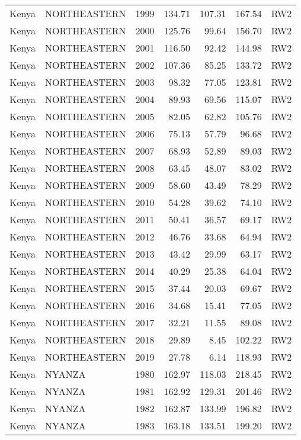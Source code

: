 \begin{longtable}{lllrrrl}
  Kenya & NORTHEASTERN & 1999 & 134.71 & 107.31 & 167.54 & RW2 \\ 
  Kenya & NORTHEASTERN & 2000 & 125.76 & 99.64 & 156.70 & RW2 \\ 
  Kenya & NORTHEASTERN & 2001 & 116.50 & 92.42 & 144.98 & RW2 \\ 
  Kenya & NORTHEASTERN & 2002 & 107.36 & 85.25 & 133.72 & RW2 \\ 
  Kenya & NORTHEASTERN & 2003 & 98.32 & 77.05 & 123.81 & RW2 \\ 
  Kenya & NORTHEASTERN & 2004 & 89.93 & 69.56 & 115.07 & RW2 \\ 
  Kenya & NORTHEASTERN & 2005 & 82.05 & 62.82 & 105.76 & RW2 \\ 
  Kenya & NORTHEASTERN & 2006 & 75.13 & 57.79 & 96.68 & RW2 \\ 
  Kenya & NORTHEASTERN & 2007 & 68.93 & 52.89 & 89.03 & RW2 \\ 
  Kenya & NORTHEASTERN & 2008 & 63.45 & 48.07 & 83.02 & RW2 \\ 
  Kenya & NORTHEASTERN & 2009 & 58.60 & 43.49 & 78.29 & RW2 \\ 
  Kenya & NORTHEASTERN & 2010 & 54.28 & 39.62 & 74.10 & RW2 \\ 
  Kenya & NORTHEASTERN & 2011 & 50.41 & 36.57 & 69.17 & RW2 \\ 
  Kenya & NORTHEASTERN & 2012 & 46.76 & 33.68 & 64.94 & RW2 \\ 
  Kenya & NORTHEASTERN & 2013 & 43.42 & 29.99 & 63.17 & RW2 \\ 
  Kenya & NORTHEASTERN & 2014 & 40.29 & 25.38 & 64.04 & RW2 \\ 
  Kenya & NORTHEASTERN & 2015 & 37.44 & 20.03 & 69.67 & RW2 \\ 
  Kenya & NORTHEASTERN & 2016 & 34.68 & 15.41 & 77.05 & RW2 \\ 
  Kenya & NORTHEASTERN & 2017 & 32.21 & 11.55 & 89.08 & RW2 \\ 
  Kenya & NORTHEASTERN & 2018 & 29.89 & 8.45 & 102.22 & RW2 \\ 
  Kenya & NORTHEASTERN & 2019 & 27.78 & 6.14 & 118.93 & RW2 \\ 
  Kenya & NYANZA & 1980 & 162.97 & 118.03 & 218.45 & RW2 \\ 
  Kenya & NYANZA & 1981 & 162.92 & 129.31 & 201.46 & RW2 \\ 
  Kenya & NYANZA & 1982 & 162.87 & 133.99 & 196.82 & RW2 \\ 
  Kenya & NYANZA & 1983 & 163.18 & 133.51 & 199.20 & RW2 \\ 

\end{longtable}

